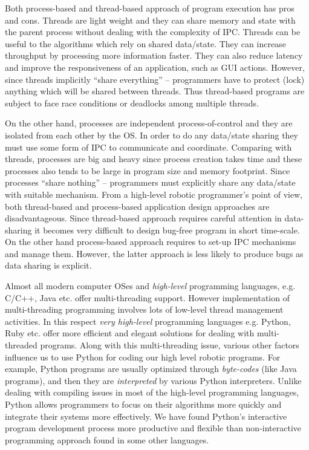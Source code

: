Both process-based and thread-based approach of  program execution has pros and cons. Threads are light weight and they can share memory and state with the parent process without dealing with the complexity of IPC.   Threads can be useful to the algorithms which rely on shared data/state. They can increase throughput by processing more information faster. They can also reduce latency and improve the responsiveness of an application, such as GUI actions. However, since threads  implicitly ``share everything'' – programmers have to protect (lock) anything which will be
shared between threads. Thus thread-based programs are subject to face race conditions or deadlocks among multiple threads.

On the other hand, processes are independent process-of-control and they are isolated from each other by the OS. In order to do any data/state sharing they must use some form of IPC to communicate and coordinate. Comparing with threads, processes are big and heavy since process creation takes time and these processes also tends to be large in program size and memory footprint.  Since processes ``share nothing'' -- programmers must explicitly share any data/state with suitable mechanism. From a high-level robotic programmer's point of view, both thread-based and process-based application design approaches are disadvantageous. Since thread-based approach requires careful attention in data-sharing it becomes very difficult to design bug-free program in short time-scale. On the other hand process-based approach requires to set-up IPC mechanisms and manage them. However, the latter approach is less likely to produce bugs as data sharing is explicit.
 
Almost all modern computer OSes and {\em high-level} programming languages, e.g. C/C++, Java etc. offer multi-threading support. However implementation of multi-threading programming involves lots of low-level thread management activities. In this respect {\em very high-level} programming languages e.g. Python, Ruby etc. offer more efficient and elegant solutions for dealing with multi-threaded programs. Along with this multi-threading issue, various other factors influence us to use Python for coding our high level robotic programs. For example, Python programs are  usually optimized through {\em byte-codes} (like Java programs), and then they are {\em interpreted} by various Python interpreters. Unlike dealing with compiling issues in most of the high-level programming languages, Python allows programmers to focus on their  algorithms more quickly and integrate their systems more effectively.  We have found Python's interactive program development process more productive and flexible than non-interactive programming approach found in some other languages.

